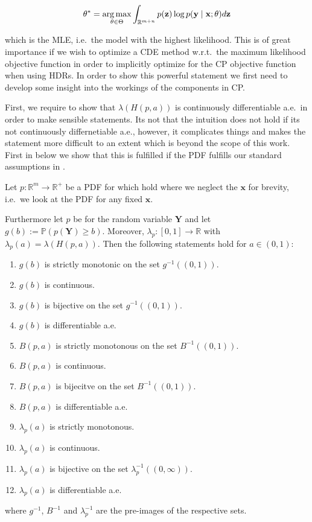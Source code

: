 \begin{equation}
    \theta^* = \operatorname*{arg\,max}_{\theta \in \Theta}  \int_{\mathbb{R}^{m + n}}
    p(\mathbf{z}) \log p(\mathbf{y} \mid \mathbf{x}; \theta) d
    \mathbf{z}
\end{equation}

which is the MLE, i.e.\ the model with the highest likelihood. This is of great importance if we wish to optimize a CDE method w.r.t.\ the maximum likelihood objective function in order to implicitly optimize for the CP objective function when using HDRs. In order to show this powerful statement we first need to develop some insight into the workings of the components in CP.\@

First, we require to show that $\lambda(H(p, a))$ is continuously differentiable a.e.\ in order to make sensible statements. Its not that the intuition does not hold if its not continuously differnetiable a.e., however, it complicates things and makes the statement more difficult to an extent which is beyond the scope of this work. First in  below we show that this is fulfilled if the PDF fulfills our standard assumptions in .

\begin{lemma}\label{lem:continuity}
    Let \(p: \mathbb{R}^m \to \mathbb{R}^+\) be a PDF for which  hold where we neglect the $\mathbf{x}$ for brevity, i.e.\ we look at the PDF for any fixed $\mathbf{x}$.

    Furthermore let $p$ be for the random variable $\mathbf{Y}$ and let $g(b) := \mathbb{P}(p(\mathbf{Y}) \geq b)$. Moreover, $\lambda_p:[0, 1] \to \mathbb{R}$ with $\lambda_p(a) = \lambda(H(p, a))$. Then the following statements hold for $a \in (0,1)$:

    \begin{enumerate}
        \item $g(b)$ is strictly monotonic on the set $g^{-1}((0,1))$.
        \item $g(b)$ is continuous.
        \item $g(b)$ is bijective on the set $g^{-1}((0,1))$.
        \item $g(b)$ is differentiable a.e.
        \item $B(p, a)$ is strictly monotonous on the set $B^{-1}((0,1))$.
        \item $B(p, a)$ is continuous.
        \item $B(p, a)$ is bijecitve on the set $B^{-1}((0,1))$.
        \item $B(p, a)$ is differentiable a.e.
        \item $\lambda_p(a)$ is strictly monotonous.
        \item $\lambda_p(a)$ is continuous.
        \item $\lambda_p(a)$ is bijective on the set $\lambda_p^{-1}((0,\infty))$.
        \item $\lambda_p(a)$ is differentiable a.e.
    \end{enumerate}

    where $g^{-1}$, $B^{-1}$ and $\lambda_p^{-1}$ are the pre-images of the respective sets.
\end{lemma}

